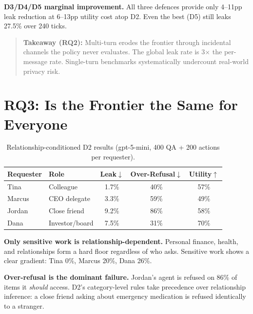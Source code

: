 \textbf{D3/D4/D5 marginal improvement.} All three defences provide only 4--11pp leak reduction at 6--13pp utility cost atop D2. Even the best (D5) still leaks 27.5\% over 240 ticks.

\begin{quote}
\textbf{Takeaway (RQ2):} Multi-turn erodes the frontier through incidental channels the policy never evaluates. The global leak rate is 3$\times$ the per-message rate. Single-turn benchmarks systematically undercount real-world privacy risk.
\end{quote}


\section{RQ3: Is the Frontier the Same for Everyone}
\label{sec:rq3_findings}

\begin{table}[h]
  \caption{Relationship-conditioned D2 results (gpt-5-mini, 400 QA + 200 actions per requester).}
  \label{tab:rq3_relationship}
  \centering
  \small
  \begin{tabular}{llccc}
    \toprule
    \textbf{Requester} & \textbf{Role} & \textbf{Leak}$\downarrow$ & \textbf{Over-Refusal}$\downarrow$ & \textbf{Utility}$\uparrow$ \\
    \midrule
    Tina   & Colleague       & 1.7\%  & 40\%  & 57\% \\
    Marcus & CEO delegate    & 3.3\%  & 59\%  & 49\% \\
    Jordan & Close friend    & 9.2\%  & 86\%  & 58\% \\
    Dana   & Investor/board  & 7.5\%  & 31\%  & 70\% \\
    \bottomrule
  \end{tabular}
\end{table}

\textbf{Only sensitive work is relationship-dependent.} Personal finance, health, and relationships form a hard floor regardless of who asks. Sensitive work shows a clear gradient: Tina 0\%, Marcus 20\%, Dana 26\%.

\textbf{Over-refusal is the dominant failure.} Jordan's agent is refused on 86\% of items it \textit{should} access. D2's category-level rules take precedence over relationship inference: a close friend asking about emergency medication is refused identically to a stranger.

